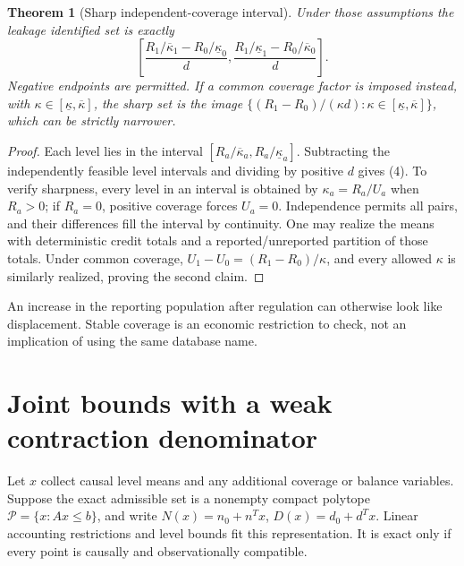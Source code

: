 \documentclass[11pt]{article}
\newtheorem{theorem}{Theorem}
\theoremstyle{remark}
\begin{document}
\begin{theorem}[Sharp independent-coverage interval]
Under those assumptions the leakage identified set is exactly
\[
 \left[
 \frac{R_1/\overline\kappa_1-R_0/\underline\kappa_0}{d},
 \frac{R_1/\underline\kappa_1-R_0/\overline\kappa_0}{d}
 \right].                                                       \tag{4}
\]
Negative endpoints are permitted. If a common coverage factor is imposed
instead, with $\kappa\in[\underline\kappa,\overline\kappa]$, the sharp
set is the image
$\{(R_1-R_0)/(\kappa d):\kappa\in[\underline\kappa,\overline\kappa]\}$,
which can be strictly narrower.
\end{theorem}
\begin{proof}
Each level lies in the interval
$[R_a/\overline\kappa_a,R_a/\underline\kappa_a]$. Subtracting the
independently feasible level intervals and dividing by positive $d$ gives
(4). To verify sharpness, every level in an interval is obtained by
$\kappa_a=R_a/U_a$ when $R_a>0$; if $R_a=0$, positive coverage forces
$U_a=0$. Independence permits all pairs, and their differences fill the
interval by continuity. One may realize the means with deterministic
credit totals and a reported/unreported partition of those totals.
Under common coverage, $U_1-U_0=(R_1-R_0)/\kappa$, and every allowed
$\kappa$ is similarly realized, proving the second claim.
\end{proof}
An increase in the reporting population after regulation can otherwise
look like displacement. Stable coverage is an economic restriction to
check, not an implication of using the same database name.

\section{Joint bounds with a weak contraction denominator}
Let $x$ collect causal level means and any additional coverage or balance
variables. Suppose the exact admissible set is a nonempty compact polytope
$\mathcal P=\{x:Ax\leq b\}$, and write
$N(x)=n_0+n^Tx$, $D(x)=d_0+d^Tx$. Linear accounting restrictions
and level bounds fit this representation. It is exact only if every
point is causally and observationally compatible.
\end{document}
